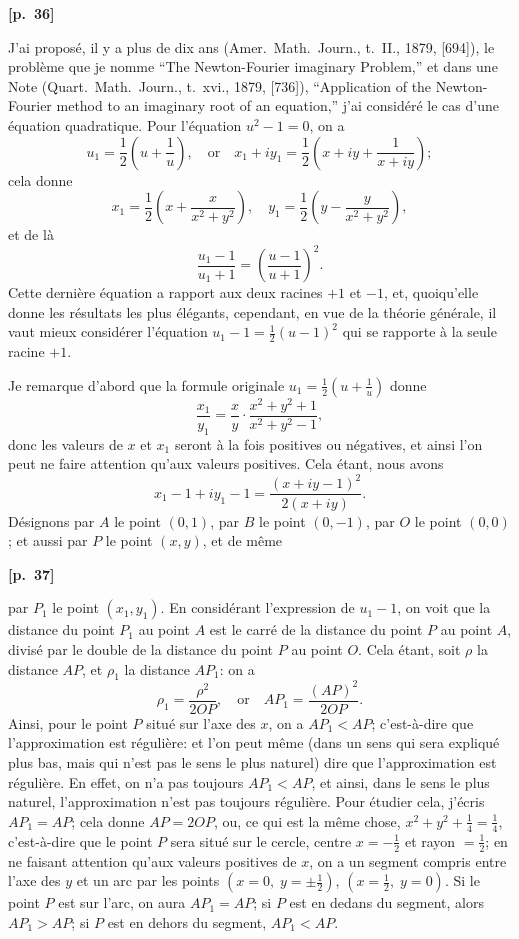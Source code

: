 \documentclass[11pt,a4paper]{article}
\theoremstyle{plain}
\begin{document}
\vspace{0.5em}
\noindent\textbf{[p.\ 36]}

J'ai propos\'e, il y a plus de dix ans (Amer.\ Math.\ Journ., t.\ II., 1879, [694]), le probl\`eme que je nomme ``The Newton-Fourier imaginary Problem,'' et dans une Note (Quart.\ Math.\ Journ., t.\ xvi., 1879, [736]), ``Application of the Newton-Fourier method to an imaginary root of an equation,'' j'ai consid\'er\'e le cas d'une \'equation quadratique. Pour l'\'equation $u^2 - 1 = 0$, on a
$$
u_1 = \frac{1}{2}\left(u + \frac{1}{u}\right), \quad \text{or} \quad x_1 + iy_1 = \frac{1}{2}\left(x + iy + \frac{1}{x + iy}\right);
$$
cela donne
$$
x_1 = \frac{1}{2}\left(x + \frac{x}{x^2 + y^2}\right), \quad y_1 = \frac{1}{2}\left(y - \frac{y}{x^2 + y^2}\right),
$$
et de l\`a
$$
\frac{u_1 - 1}{u_1 + 1} = \left(\frac{u - 1}{u + 1}\right)^2.
$$
Cette derni\`ere \'equation a rapport aux deux racines $+1$ et $-1$, et, quoiqu'elle donne les r\'esultats les plus \'el\'egants, cependant, en vue de la th\'eorie g\'en\'erale, il vaut mieux consid\'erer l'\'equation $u_1 - 1 = \frac{1}{2}(u - 1)^2$ qui se rapporte \`a la seule racine $+1$.

Je remarque d'abord que la formule originale $u_1 = \frac{1}{2}(u + \frac{1}{u})$ donne
$$
\frac{x_1}{y_1} = \frac{x}{y} \cdot \frac{x^2 + y^2 + 1}{x^2 + y^2 - 1},
$$
donc les valeurs de $x$ et $x_1$ seront \`a la fois positives ou n\'egatives, et ainsi l'on peut ne faire attention qu'aux valeurs positives. Cela \'etant, nous avons
$$
x_1 - 1 + i y_1 - 1 = \frac{(x + iy - 1)^2}{2(x + iy)}.
$$
D\'esignons par $A$ le point $(0, 1)$, par $B$ le point $(0, -1)$, par $O$ le point $(0, 0)$; et aussi par $P$ le point $(x, y)$, et de m\^eme

\vspace{0.5em}
\noindent\textbf{[p.\ 37]}

par $P_1$ le point $(x_1, y_1)$. En consid\'erant l'expression de $u_1 - 1$, on voit que la distance du point $P_1$ au point $A$ est le carr\'e de la distance du point $P$ au point $A$, divis\'e par le double de la distance du point $P$ au point $O$. Cela \'etant, soit $\rho$ la distance $AP$, et $\rho_1$ la distance $AP_1$: on a
$$
\rho_1 = \frac{\rho^2}{2OP}, \quad \text{or} \quad AP_1 = \frac{(AP)^2}{2OP}.
$$
Ainsi, pour le point $P$ situ\'e sur l'axe des $x$, on a $AP_1 < AP$; c'est-\`a-dire que l'approximation est r\'eguli\`ere: et l'on peut m\^eme (dans un sens qui sera expliqu\'e plus bas, mais qui n'est pas le sens le plus naturel) dire que l'approximation est r\'eguli\`ere. En effet, on n'a pas toujours $AP_1 < AP$, et ainsi, dans le sens le plus naturel, l'approximation n'est pas toujours r\'eguli\`ere. Pour \'etudier cela, j'\'ecris $AP_1 = AP$; cela donne $AP = 2OP$, ou, ce qui est la m\^eme chose, $x^2 + y^2 + \frac{1}{4} = \frac{1}{4}$, c'est-\`a-dire que le point $P$ sera situ\'e sur le cercle, centre $x = -\frac{1}{2}$ et rayon $= \frac{1}{2}$; en ne faisant attention qu'aux valeurs positives de $x$, on a un segment compris entre l'axe des $y$ et un arc par les points $(x = 0,\; y = \pm \frac{1}{2})$, $(x = \frac{1}{2},\; y = 0)$. Si le point $P$ est sur l'arc, on aura $AP_1 = AP$; si $P$ est en dedans du segment, alors $AP_1 > AP$; si $P$ est en dehors du segment, $AP_1 < AP$.
\end{document}
